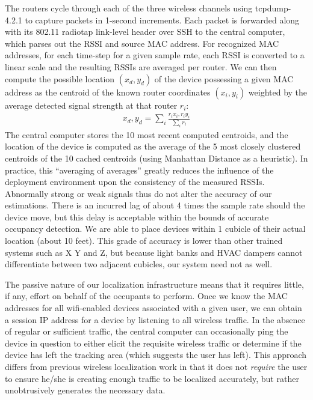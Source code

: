 The routers cycle through each of the three wireless channels using tcpdump-4.2.1 to capture packets in 1-second increments. Each packet is forwarded along with its 802.11 radiotap link-level header over SSH to the central computer, which parses out the RSSI and source MAC address. For recognized MAC addresses, for each time-step for a given sample rate, each RSSI is converted to a linear scale and the resulting RSSIs are averaged per router. We can then compute the possible location $(x_d,y_d)$ of the device possessing a given MAC address as the centroid of the known router coordinates $(x_i, y_i)$ weighted by the average detected signal strength at that router $r_i$:
\begin{equation}
\begin{split}
x_d, y_d = \displaystyle\sum_{i} \frac{r_ix_i, r_iy_i}{\displaystyle\sum_i r_i}
\end{split}
\end{equation}
The central computer stores the 10 most recent computed centroids, and the location of the device is computed as the average of the 5 most closely clustered centroids of the 10 cached centroids (using Manhattan Distance as a heuristic). In practice, this ``averaging of averages'' greatly reduces the influence of the deployment environment upon the consistency of the measured RSSIs. Abnormally strong or weak signals thus do not alter the accuracy of our estimations. There is an incurred lag of about 4 times the sample rate should the device move, but this delay is acceptable within the bounds of accurate occupancy detection. We are able to place devices within 1 cubicle of their actual location (about 10 feet). This grade of accuracy is lower than other trained systems such as X Y and Z, but because light banks and HVAC dampers cannot differentiate between two adjacent cubicles, our system need not as well.

The passive nature of our localization infrastructure means that it requires little, if any, effort on behalf of the occupants to perform. Once we know the MAC addresses for all wifi-enabled devices associated with a given user, we can obtain a session IP address for a device by listening to all wireless traffic. In the absence of regular or sufficient traffic, the central computer can occasionally ping the device in question to either elicit the requisite wireless traffic or determine if the device has left the tracking area (which suggests the user has left). This approach differs from previous wireless localization work in that it does not \emph{require} the user to ensure he/she is creating enough traffic to be localized accurately, but rather unobtrusively generates the necessary data. 


